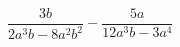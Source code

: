 \begin{ex}
	\begin{condition}
		\( \dfrac{3b}{2a^3b-8a^2b^2}-\dfrac{5a}{12a^3b-3a^4} \)
	\end{condition}
\end{ex}